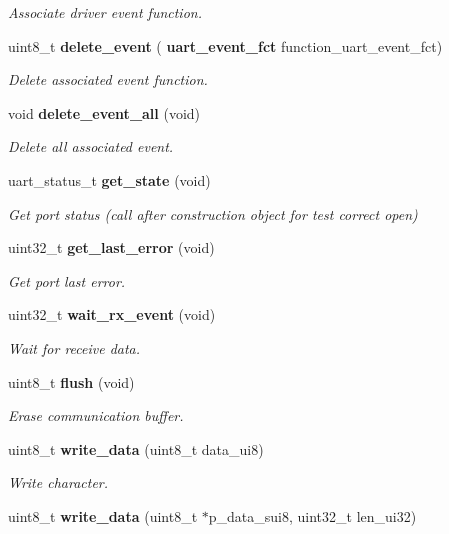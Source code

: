 \begin{DoxyCompactItemize}
\begin{DoxyCompactList}\small\item\em Associate driver event function. \end{DoxyCompactList}\item 
uint8\+\_\+t \textbf{ delete\+\_\+event} (\textbf{ uart\+\_\+event\+\_\+fct} function\+\_\+uart\+\_\+event\+\_\+fct)
\begin{DoxyCompactList}\small\item\em Delete associated event function. \end{DoxyCompactList}\item 
void \textbf{ delete\+\_\+event\+\_\+all} (void)
\begin{DoxyCompactList}\small\item\em Delete all associated event. \end{DoxyCompactList}\item 
uart\+\_\+status\+\_\+t \textbf{ get\+\_\+state} (void)
\begin{DoxyCompactList}\small\item\em Get port status (call after construction object for test correct open) \end{DoxyCompactList}\item 
uint32\+\_\+t \textbf{ get\+\_\+last\+\_\+error} (void)
\begin{DoxyCompactList}\small\item\em Get port last error. \end{DoxyCompactList}\item 
uint32\+\_\+t \textbf{ wait\+\_\+rx\+\_\+event} (void)
\begin{DoxyCompactList}\small\item\em Wait for receive data. \end{DoxyCompactList}\item 
uint8\+\_\+t \textbf{ flush} (void)
\begin{DoxyCompactList}\small\item\em Erase communication buffer. \end{DoxyCompactList}\item 
uint8\+\_\+t \textbf{ write\+\_\+data} (uint8\+\_\+t data\+\_\+ui8)
\begin{DoxyCompactList}\small\item\em Write character. \end{DoxyCompactList}\item 
uint8\+\_\+t \textbf{ write\+\_\+data} (uint8\+\_\+t $\ast$p\+\_\+data\+\_\+sui8, uint32\+\_\+t len\+\_\+ui32)

\end{DoxyCompactItemize}
